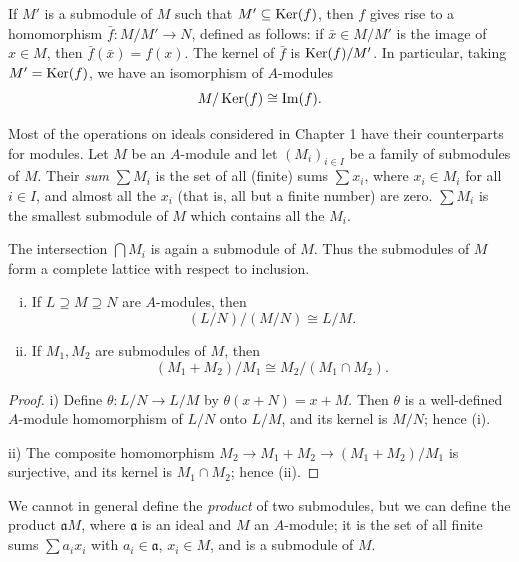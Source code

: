 If $M'$ is a submodule of $M$ such that $M' \subseteq \operatorname{Ker}(f)$, then $f$ gives rise to a homomorphism $\bar{f} \colon M/M' \to N$, defined as follows: if $\bar{x} \in M/M'$ is the image of $x \in M$, then $\bar{f}(\bar{x}) = f(x)$. The kernel of $\bar{f}$ is $\operatorname{Ker}(f)/M'$. In particular, taking $M' = \operatorname{Ker}(f)$, we have an isomorphism of $A$-modules
\[
    M/\operatorname{Ker}(f) \cong \operatorname{Im}(f).
\]


Most of the operations on ideals considered in Chapter 1 have their counterparts for modules. Let $M$ be an $A$-module and let $(M_i)_{i \in I}$ be a family of submodules of $M$. Their \emph{sum} $\sum M_i$ is the set of all (finite) sums $\sum x_i$, where $x_i \in M_i$ for all $i \in I$, and almost all the $x_i$ (that is, all but a finite number) are zero. $\sum M_i$ is the smallest submodule of $M$ which contains all the $M_i$.

The intersection $\bigcap M_i$ is again a submodule of $M$. Thus the submodules of $M$ form a complete lattice with respect to inclusion.

\begin{proposition}\label{prop:submodule-isomorphisms}
\begin{enumerate}[i)]
    \item If $L \supseteq M \supseteq N$ are $A$-modules, then
    \[
        (L/N)/(M/N) \cong L/M.
    \]
    \item If $M_1, M_2$ are submodules of $M$, then
    \[
        (M_1 + M_2)/M_1 \cong M_2/(M_1 \cap M_2).
    \]
\end{enumerate}
\end{proposition}

\begin{proof}
i) Define $\theta \colon L/N \to L/M$ by $\theta(x + N) = x + M$. Then $\theta$ is a well-defined $A$-module homomorphism of $L/N$ onto $L/M$, and its kernel is $M/N$; hence (i).

ii) The composite homomorphism $M_2 \to M_1 + M_2 \to (M_1 + M_2)/M_1$ is surjective, and its kernel is $M_1 \cap M_2$; hence (ii).
\end{proof}

We cannot in general define the \emph{product} of two submodules, but we can define the product $\mathfrak{a}M$, where $\mathfrak{a}$ is an ideal and $M$ an $A$-module; it is the set of all finite sums $\sum a_i x_i$ with $a_i \in \mathfrak{a}$, $x_i \in M$, and is a submodule of $M$.

